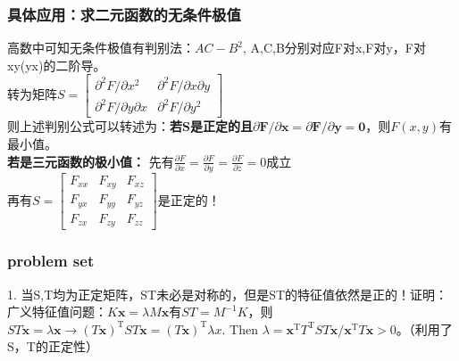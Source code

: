 \documentclass[UTF8]{article}
\begin{document}
    \subsubsection{具体应用：求二元函数的无条件极值}
    高数中可知无条件极值有判别法：$AC-B^{2}$, A,C,B分别对应F对x,F对y，F对xy(yx)的二阶导。\\
    转为矩阵$S=\left[\begin{array}{ll}{\partial^{2} F / \partial x^{2}} & {\partial^{2} F / \partial x \partial y} \\ {\partial^{2} F / \partial y \partial x} & {\partial^{2} F / \partial y^{2}}\end{array}\right]$
    \\
    则上述判别公式可以转述为：\textbf{若S是正定的且$\partial \boldsymbol{F} / \partial \boldsymbol{x}=\partial \boldsymbol{F} / \partial \boldsymbol{y}=\mathbf{0}$}，则$F(x,y)$有最小值。
    \\
    \textbf{若是三元函数的极小值：}
    先有$\frac{\partial F}{\partial x}=\frac{\partial F}{\partial y}=\frac{\partial F}{\partial z}=0$成立\\
    再有$S=\left[\begin{array}{ccc}{F_{x x}} & {F_{x y}} & {F_{x z}} \\ {F_{y x}} & {F_{y y}} & {F_{y z}} \\ {F_{z x}} & {F_{z y}} & {F_{z z}}\end{array}\right]$是正定的！
    
    \subsubsection{problem set}
    1. 当S,T均为正定矩阵，ST未必是对称的，但是ST的特征值依然是正的！证明：广义特征值问题：$K \boldsymbol{x}=\lambda M \boldsymbol{x}$有$S T=M^{-1} K$，则$S T \boldsymbol{x}=\lambda \boldsymbol{x} \rightarrow (T \boldsymbol{x})^{\mathrm{T}} S T \boldsymbol{x}=(T \boldsymbol{x})^{\mathrm{T}} \lambda x .$ Then $\lambda=\boldsymbol{x}^{\mathrm{T}} T^{\mathrm{T}} S T \boldsymbol{x} / \boldsymbol{x}^{\mathrm{T}} T \boldsymbol{x}>0$。（利用了S，T的正定性）
    
\end{document}
